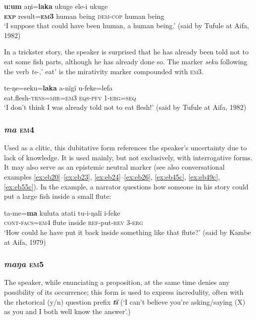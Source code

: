\documentclass[output=paper]{langsci/langscibook}
\begin{document}
\begin{exe}
	\ex \label{ex:eb5}
	\gll \textbf{u:um} aŋi=\textbf{laka} ukuge ele-i ukuge\\
	\textbf{\textsc{exp}} result=\textbf{\textsc{em}3} {human being} \textsc{dem-cop} {human being}\\
	\trans ‘I suppose that could have been human, a human being.’ (said by Tufule at Aifa, 1982)
\end{exe}

In a trickster story,  the speaker is surprised that he has already been told not to eat some fish parts, although he has already done so. The marker \textit{seku} following the verb \textit{te}-,’ eat’ is the mirativity marker compounded with \textsc{em}3.  

\begin{exe}
	\ex \label{ex:eb6}
	\gll te-ŋe=seku=\textbf{laka} a-nïgï u-feke=lefa\\
	  eat.flesh-\textsc{trns=mir=em3} \textsc{eqs-pfv} 1-\textsc{erg=seq}\\
	\trans ‘I don’t think I was already told not to eat flesh!’ (said by Tufule at Aifa, 1982)
\end{exe}

\subsubsection{\textit{ma} \textsc{em}4}
Used as a clitic, this dubitative form references the speaker’s uncertainty due to lack of knowledge.  It is used mainly, but not exclusively, with interrogative forms. It may also serve as an epistemic neutral marker (see also conversational examples \ref{ex:eb20}--\ref{ex:eb23}, \ref{ex:eb24}--\ref{ex:eb26}, \ref{ex:eb45c}, \ref{ex:eb49c}, \ref{ex:eb55c}). In the example, a narrator questions how someone in his story could put a large fish inside a small flute:

\begin{exe}
	\ex \label{ex:eb7}
	\gll ta-me=\textbf{ma} kuluta atati tu-i-ŋalï i-feke\\
	\textsc{cont-facs=em4} flute inside \textsc{ref}-put-\textsc{rev} 3-\textsc{erg}\\
	\trans ‘How could he have put it back inside something like that flute?’ (said by Kambe at Aifa, 1979)
\end{exe}

\subsubsection{\textit{maŋa} \textsc{em}5} 
The speaker, while enunciating a proposition, at the same time denies any possibility of its occurrence; this form is used to express incredulity, often with the rhetorical (y/n) question prefix \textbf{\textit{tï}} (‘I can’t believe you’re asking/saying (X) as you and I both well know the answer’.)
\end{document}
